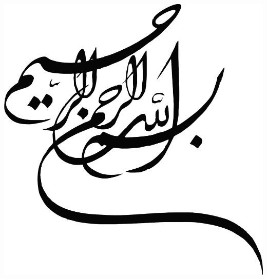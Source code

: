 

\thispagestyle{empty}
\begin{center}
	~\vfill
	~\vfill
\end{center}
\pagebreak

\thispagestyle{empty}
\begin{center}
	~\vfill
	\includegraphics[scale=1]{images/besm.jpg}
	~\vfill
\end{center}
\pagebreak

